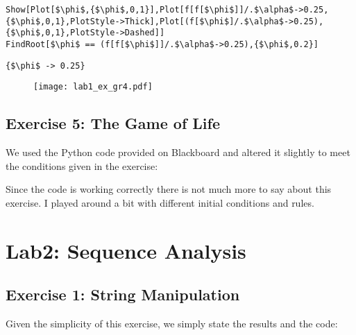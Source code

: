 \documentclass[11pt,a4paper,onecolumn]{article}
\begin{document}
\begin{lstlisting}[mathescape]
Show[Plot[$\phi$,{$\phi$,0,1}],Plot[f[f[$\phi$]]/.$\alpha$->0.25,{$\phi$,0,1},PlotStyle->Thick],Plot[(f[$\phi$]/.$\alpha$->0.25),{$\phi$,0,1},PlotStyle->Dashed]]
FindRoot[$\phi$ == (f[f[$\phi$]]/.$\alpha$->0.25),{$\phi$,0.2}]
\end{lstlisting}
\begin{lstlisting}[mathescape]
{$\phi$ -> 0.25}
\end{lstlisting}

\begin{figure}[H]
  \centering
  \texttt{[image: lab1\_ex\_gr4.pdf]}  
\end{figure}

\subsection{Exercise 5: The Game of Life}

We used the Python code provided on Blackboard and altered it slightly to meet the conditions given in the exercise:



Since the code is working correctly there is not much more to say about this exercise. I played around a bit with different initial conditions and rules.


\newpage

\section{Lab2: Sequence Analysis}
\subsection{Exercise 1: String Manipulation}

Given the simplicity of this exercise, we simply state the results and the code:
\end{document}
